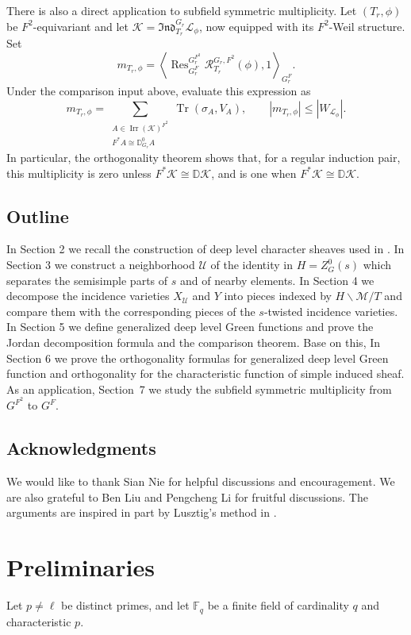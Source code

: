 \documentclass[11pt,letterpaper]{amsart}
\theoremstyle{definition}
\numberwithin{equation}{section}
\numberwithin{theorem}{section}
\begin{document}
There is also a direct application to  subfield symmetric multiplicity.  Let
\((T_r,\phi)\) be \(F^2\)-equivariant and let
\(\mathcal K=\mathfrak{Ind}_{T_r}^{G_r}\mathcal L_\phi\), now equipped
with its \(F^2\)-Weil structure.  Set
\[
 m_{T_r,\phi}
 =\left\langle
   \operatorname{Res}_{G_r^F}^{G_r^{F^2}}
      \mathcal R_{T_r}^{G_r,F^2}(\phi),1
  \right\rangle_{G_r^F}.
\]
Under the comparison input above, 
evaluate this expression as
\[
 m_{T_r,\phi}
 =\sum_{\substack{A\in\operatorname{Irr}(\mathcal K)^{F^2}\\
                    F^*A\cong\mathbb D_{G_r}^0A}}
           \operatorname{Tr}(\sigma_A,V_A),
 \qquad |m_{T_r,\phi}|\leq |W_{\mathcal L_\phi}|.
\]
In particular, the orthogonality theorem shows
that, for a regular induction pair, this multiplicity is zero unless
\(F^*\mathcal K\cong\mathbb D\mathcal K\), and is one when \(F^*\mathcal K\cong\mathbb D\mathcal K\). 


\subsection{Outline}
In Section 2 we recall the construction of deep level character sheaves
used in \cite{INY25}.  In Section 3 we construct a neighborhood $\mathcal{U}$ of the
identity in \(H=Z_G^0(s)\) which separates the semisimple parts of \(s\)
and of nearby elements.  In Section 4 we decompose the incidence
varieties \(X_\mathcal{U}\) and \(Y\) into pieces indexed by
\(H\backslash\mathcal M/T\) and compare them with the corresponding
pieces of the \(s\)-twisted incidence varieties.  In Section 5 we
define generalized deep level Green functions and prove the Jordan
decomposition formula and the comparison theorem. Base on this, In Section 6 we prove the
orthogonality formulas for generalized deep level Green function and orthogonality for the characteristic function of simple induced sheaf. As an application, Section~7 we study the  subfield
symmetric multiplicity from \(G^{F^2}\) to \(G^F\).
\subsection*{Acknowledgments} We would like to thank Sian Nie for helpful discussions and encouragement. We are also grateful to Ben Liu and Pengcheng Li for fruitful discussions.  The arguments are inspired in part by Lusztig's method in \cite{Lus_Ch2}.


\section{Preliminaries}\label{pre}
Let $p\neq\ell$ be distinct primes, and let $\mathbb F_q$ be a finite
field of cardinality $q$ and characteristic $p$.
\end{document}
